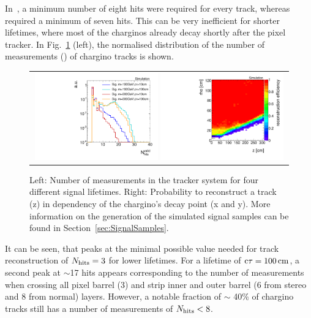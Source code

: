 In~\cite{bib:CMS:HSCP_8TeV}, a minimum number of eight hits were required for every track, whereas~\cite{bib:CMS:DT_8TeV} required a minimum of seven hits.
This can be very inefficient for shorter lifetimes, where most of the charginos already decay shortly after the pixel tracker.
In Fig.~\ref{fig:NHits_2Signal_noSelection_normalized} (left), the normalised distribution of the number of measurements (\nhits) of chargino tracks is shown. 
\begin{figure}[!b]
  \centering 
  \begin{tabular}{c}
  \includegraphics[width=0.49\textwidth]{figures/analysis_2/MotivationAndGeneralSearchStrategy/htrackNValid_log_chiTracksnoSelection.pdf}
  \includegraphics[width=0.49\textwidth]{figures/analysis_2/MotivationAndGeneralSearchStrategy/RecoEffTracksZoom.pdf}
  \end{tabular}
  \caption{Left: Number of measurements in the tracker system \nhits for four different signal lifetimes.
           Right: Probability to reconstruct a track (z) in dependency of the chargino's decay point (x and y).
           More information on the generation of the simulated signal samples can be found in Section~\ref{sec:SignalSamples}.} 
  \label{fig:NHits_2Signal_noSelection_normalized}
\end{figure}
It can be seen, that \nhits peaks at the minimal possible value needed for track reconstruction of $N_{\text{hits}}=3$ for lower lifetimes.
For a lifetime of $\text{c}\tau=100\,\text{cm}$, a second peak at $\sim$17 hits appears corresponding to the number of measurements when crossing all pixel barrel (3) and strip inner and outer barrel (6 from stereo and 8 from normal) layers.
However, a notable fraction of $\sim$ 40\% of chargino tracks still has a number of measurements of $N_{\text{hits}}<8$. 

